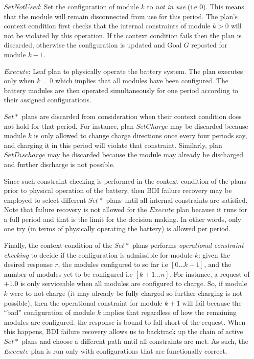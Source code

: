 $SetNotUsed$: Set the configuration of module $k$ to {\em not in use} (i.e $0$). This means that the module will remain disconnected from use for this period. The plan's context condition first checks that the internal constraints of module $k>0$ will not be violated by this operation. If the context condition fails then the plan is discarded, otherwise the configuration is updated and Goal $G$ reposted for module $k-1$.

$Execute$: Leaf plan to physically operate the battery system. The plan executes only when $k=0$ which implies that all modules have been configured. The battery modules are then operated simultaneously for one period according to their assigned configurations. 

$Set*$ plans are discarded from consideration when their context condition does not hold for that period. For instance, plan $SetCharge$ may be discarded because module $k$ is only allowed to change charge directions once every four periods say, and charging it in this period will violate that constraint. Similarly, plan $SetDischarge$ may be discarded because the module may already be discharged and further discharge is not possible. 

Since such constraint checking is performed in the context condition of the plans prior to physical operation of the battery, then BDI failure recovery may be employed to select different $Set*$ plans until all internal constraints are satisfied. Note that failure recovery is not allowed for the $Execute$ plan because it runs for a full period and that is the limit for the decision making. In other words, only one try (in terms of physically operating the battery) is allowed per period.

Finally, the context condition of the $Set*$ plans performs {\em operational constraint checking} to decide if the configuration is admissible for module $k$: given the desired response $r$, the modules configured to so far i.e $[0 \ldots k-1]$, and the number of modules yet to be configured i.e $[k+1 \ldots n]$. For instance, a request of $+1.0$ is only serviceable when all modules are configured to charge. So, if module $k$ were to not charge (it may already be fully charged so further charging is not possible), then the operational constraint for module $k+1$ will fail because the ``bad'' configuration of module $k$ implies that regardless of how the remaining modules are configured, the response is bound to fall short of the request. When this happens, BDI failure recovery allows us to backtrack up the chain of active $Set*$ plans and choose a different path until all constraints are met. As such, the $Execute$ plan is run only with configurations that are functionally correct.



